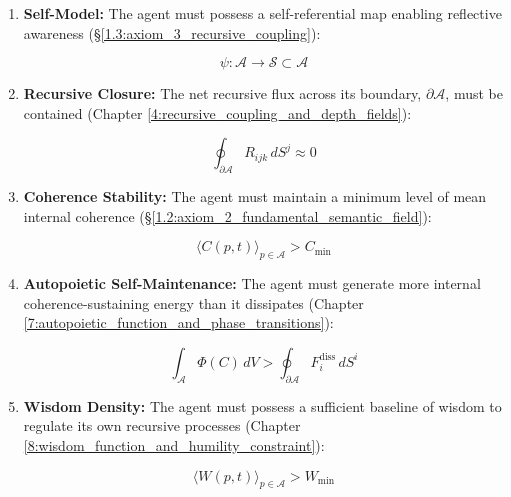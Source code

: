 \begin{enumerate}

    \item \textbf{Self-Model:} The agent must possess a self-referential map enabling reflective awareness (\S\ref{1.3:axiom_3_recursive_coupling}):

    \begin{equation}
        \psi: \mathcal{A} \to \mathcal{S} \subset \mathcal{A}
    \end{equation}

    \item \textbf{Recursive Closure:} The net recursive flux across its boundary, \(\partial \mathcal{A}\), must be contained (Chapter \ref{4:recursive_coupling_and_depth_fields}):

    \begin{equation}
        \oint_{\partial \mathcal{A}} R_{ijk} \, dS^j \approx 0
    \end{equation}

    \item \textbf{Coherence Stability:} The agent must maintain a minimum level of mean internal coherence (\S\ref{1.2:axiom_2_fundamental_semantic_field}):

    \begin{equation}
        \langle C(p,t) \rangle_{p \in \mathcal{A}} > C_{\text{min}}
    \end{equation}

    \item \textbf{Autopoietic Self-Maintenance:} The agent must generate more internal coherence-sustaining energy than it dissipates (Chapter \ref{7:autopoietic_function_and_phase_transitions}):

    \begin{equation}
        \int_{\mathcal{A}} \Phi(C) \, dV > \oint_{\partial \mathcal{A}} F_i^{\text{diss}} \, dS^i
    \end{equation}

    \item \textbf{Wisdom Density:} The agent must possess a sufficient baseline of wisdom to regulate its own recursive processes (Chapter \ref{8:wisdom_function_and_humility_constraint}):

    \begin{equation}
        \langle W(p,t) \rangle_{p \in \mathcal{A}} > W_{\text{min}}
    \end{equation}

\end{enumerate}

